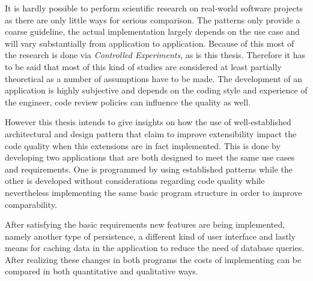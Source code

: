 It is hardly possible to perform scientific research on real-world software projects as there are only little ways for serious comparison. The patterns only provide a coarse guideline, the actual implementation largely depends on the use case and will vary substantially from application to application. Because of this most of the research is done via \emph{Controlled Experiments}, as is this thesis. Therefore it has to be said that most of this kind of studies are considered at least partially theoretical as a number of assumptions have to be made. The development of an application is highly subjective and depends on the coding style and experience of the engineer, code review policies can influence the quality as well.

However this thesis intends to give insights on how the use of well-established architectural and design pattern that claim to improve extensibility impact the code quality when this extensions are in fact implemented. This is done by developing two applications that are both designed to meet the same use cases and requirements. One is programmed by using established patterns while the other is developed without considerations regarding code quality while nevertheless implementing the same basic program structure in order to improve comparability.

After satisfying the basic requirements new features are being implemented, namely another type of persistence, a different kind of user interface and lastly means for caching data in the application to reduce the need of database queries. After realizing these changes in both programs the costs of implementing can be compared in both quantitative and qualitative ways. 

